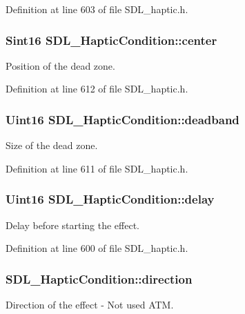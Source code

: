Definition at line 603 of file S\+D\+L\+\_\+haptic.\+h.

\hypertarget{structSDL__HapticCondition_ad29db17143c5666e302c77e8e1b40ca0}{
\subsubsection[{center}]{\setlength{\rightskip}{0pt plus 5cm}Sint16 S\+D\+L\+\_\+\+Haptic\+Condition\+::center}}\label{structSDL__HapticCondition_ad29db17143c5666e302c77e8e1b40ca0}
Position of the dead zone. 

Definition at line 612 of file S\+D\+L\+\_\+haptic.\+h.

\hypertarget{structSDL__HapticCondition_a7b343c95c46a3dd44ead46b169bc3f6f}{
\subsubsection[{deadband}]{\setlength{\rightskip}{0pt plus 5cm}Uint16 S\+D\+L\+\_\+\+Haptic\+Condition\+::deadband}}\label{structSDL__HapticCondition_a7b343c95c46a3dd44ead46b169bc3f6f}
Size of the dead zone. 

Definition at line 611 of file S\+D\+L\+\_\+haptic.\+h.

\hypertarget{structSDL__HapticCondition_aad40417980530ca8d80c62ba864a090b}{
\subsubsection[{delay}]{\setlength{\rightskip}{0pt plus 5cm}Uint16 S\+D\+L\+\_\+\+Haptic\+Condition\+::delay}}\label{structSDL__HapticCondition_aad40417980530ca8d80c62ba864a090b}
Delay before starting the effect. 

Definition at line 600 of file S\+D\+L\+\_\+haptic.\+h.

\hypertarget{structSDL__HapticCondition_a728507d30d18998949313de3a25e5581}{
\subsubsection[{direction}]{ S\+D\+L\+\_\+\+Haptic\+Condition\+::direction}}\label{structSDL__HapticCondition_a728507d30d18998949313de3a25e5581}
Direction of the effect -\/ Not used A\+T\+M. 

